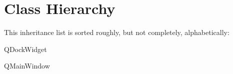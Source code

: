 \section{Class Hierarchy}
This inheritance list is sorted roughly, but not completely, alphabetically\-:\begin{DoxyCompactList}
\item Q\-Dock\-Widget\begin{DoxyCompactList}
\item {}
\end{DoxyCompactList}
\item Q\-Main\-Window\begin{DoxyCompactList}
\item {}
\end{DoxyCompactList}
\item {}
\begin{DoxyCompactList}
\item {}
\begin{DoxyCompactList}
\item {}
\end{DoxyCompactList}
\end{DoxyCompactList}
\end{DoxyCompactList}

